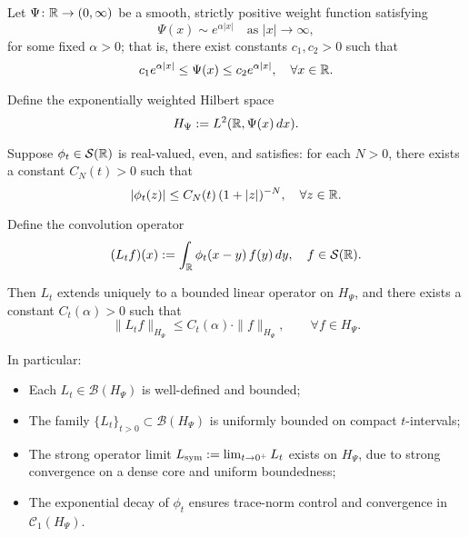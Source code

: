 \begin{proposition}
\label{prop:boundedness_Lt_weighted}
Let \( \Psi \colon \mathbb{R} \to (0,\infty) \) be a smooth, strictly positive weight function satisfying
\[
\Psi(x) \sim e^{\alpha |x|} \quad \text{as } |x| \to \infty,
\]
for some fixed \( \alpha > 0 \); that is, there exist constants \( c_1, c_2 > 0 \) such that
\[
c_1 e^{\alpha |x|} \le \Psi(x) \le c_2 e^{\alpha |x|}, \quad \forall x \in \mathbb{R}.
\]

Define the exponentially weighted Hilbert space
\[
H_\Psi := L^2(\mathbb{R}, \Psi(x)\, dx).
\]

Suppose \( \phi_t \in \mathcal{S}(\mathbb{R}) \) is real-valued, even, and satisfies: for each \( N > 0 \), there exists a constant \( C_N(t) > 0 \) such that
\[
|\phi_t(z)| \le C_N(t)\, (1 + |z|)^{-N}, \quad \forall z \in \mathbb{R}.
\]

Define the convolution operator
\[
(L_t f)(x) := \int_{\mathbb{R}} \phi_t(x - y)\, f(y)\, dy, \quad f \in \mathcal{S}(\mathbb{R}).
\]

Then \( L_t \) extends uniquely to a bounded linear operator on \( H_\Psi \), and there exists a constant \( C_t(\alpha) > 0 \) such that
\[
\| L_t f \|_{H_\Psi} \le C_t(\alpha) \cdot \| f \|_{H_\Psi}, \qquad \forall f \in H_\Psi.
\]

In particular:
\begin{itemize}
    \item Each \( L_t \in \mathcal{B}(H_\Psi) \) is well-defined and bounded;
    \item The family \( \{L_t\}_{t > 0} \subset \mathcal{B}(H_\Psi) \) is uniformly bounded on compact \( t \)-intervals;
    \item The strong operator limit \( L_{\mathrm{sym}} := \lim_{t \to 0^+} L_t \) exists on \( H_\Psi \), due to strong convergence on a dense core and uniform boundedness;
    \item The exponential decay of \( \phi_t \) ensures trace-norm control and convergence in \( \mathcal{C}_1(H_\Psi) \).
\end{itemize}
\end{proposition}
